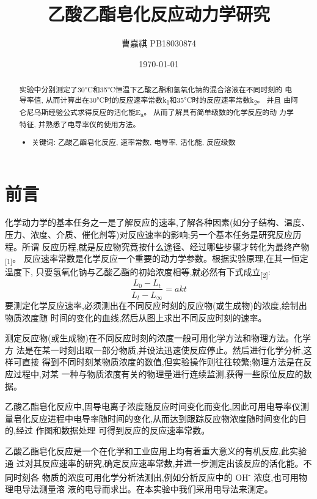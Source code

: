\documentclass[11pt]{article}
\author{曹嘉祺 PB18030874}
\date{\today}
\title{乙酸乙酯皂化反应动力学研究}
\begin{document}
\maketitle
\begin{abstract}


实验中分别测定了30°C和35°C恒温下乙酸乙酯和氢氧化钠的混合溶液在不同时刻的
电导率值, 从而计算出在30°C时的反应速率常数k\textsubscript{1}和35°C时的反应速率常数k\textsubscript{2}。 并且
由阿仑尼乌斯经验公式求得反应的活化能E\textsubscript{a}。 从而了解具有简单级数的化学反应的动
力学特征, 并熟悉了电导率仪的使用方法。

\begin{itemize}
\item 关键词: 乙酸乙酯皂化反应, 速率常数, 电导率, 活化能, 反应级数
\end{itemize}
\end{abstract}
\section{前言}
\label{sec:org758edcf}
化学动力学的基本任务之一是了解反应的速率,了解各种因素(如分子结构、温度、
压力、浓度、介质、催化剂等)对反应速率的影响;另一个基本任务是研究反应历程。所谓
反应历程,就是反应物究竟按什么途径、经过哪些步骤才转化为最终产物\textsubscript{[1]}。
反应速率常数是化学反应一个重要的动力学参数。根据实验原理,在其一恒定温度下,
只要氢氧化钠与乙酸乙酯的初始浓度相等,就必然有下式成立\textsubscript{[2]}:
\[
\frac{L_{0}-L_{t}}{L_{t}-L_{\infty}}=akt
\]
要测定化学反应速率,必须测出在不同反应时刻的反应物(或生成物)的浓度,绘制出物质浓度随
时间的变化的血线,然后从图上求出不同反应时刻的速率。

测定反应物(或生成物)在不同反应时刻的浓度一般可用化学方法和物理方法。化学方
法是在某一时刻出取一部分物质,并设法迅速使反应停止。然后进行化学分析,这样可直接
得到不同时刻某物质浓度的数值,但实验操作则往往较繁;物理方法是在反应过程中,对某
一种与物质浓度有关的物理量进行连续监测,获得一些原位反应的数据。

乙酸乙酯皂化反应中,固导电离子浓度随反应时间变化而变化,因此可用电导率仪测
量皂化反应进程中电导率随时间的变化,从而达到跟踪反应物浓度随时间变化的目的,经过
作图和数据处理 可得到反应的反应速率常数。

乙酸乙酯皂化反应是一个在化学和工业应用上均有着重大意义的有机反应,此实验通
过对其反应速率的研究,确定反应速率常数,并进一步测定出该反应的活化能。不同时刻各
物质的浓度可用化学分析法测出,例如分析反应中的 OH\textsuperscript{-} 浓度,也可用物理电导法测量溶
液的电导而求出。在本实验中我们采用电导法来测定。
\end{document}
